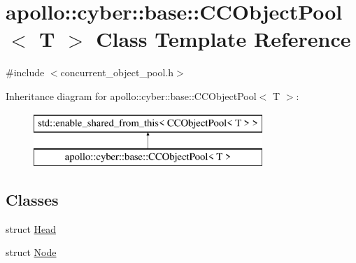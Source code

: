 \hypertarget{classapollo_1_1cyber_1_1base_1_1CCObjectPool}{\section{apollo\-:\-:cyber\-:\-:base\-:\-:C\-C\-Object\-Pool$<$ T $>$ Class Template Reference}
\label{classapollo_1_1cyber_1_1base_1_1CCObjectPool}
}


{\ttfamily \#include $<$concurrent\-\_\-object\-\_\-pool.\-h$>$}

Inheritance diagram for apollo\-:\-:cyber\-:\-:base\-:\-:C\-C\-Object\-Pool$<$ T $>$\-:\begin{figure}[H]
\begin{center}
\leavevmode
\includegraphics[height=2.000000cm]{classapollo_1_1cyber_1_1base_1_1CCObjectPool}
\end{center}
\end{figure}
\subsection*{Classes}
\begin{DoxyCompactItemize}
\item 
struct \hyperlink{structapollo_1_1cyber_1_1base_1_1CCObjectPool_1_1Head}{Head}
\item 
struct \hyperlink{structapollo_1_1cyber_1_1base_1_1CCObjectPool_1_1Node}{Node}
\end{DoxyCompactItemize}
